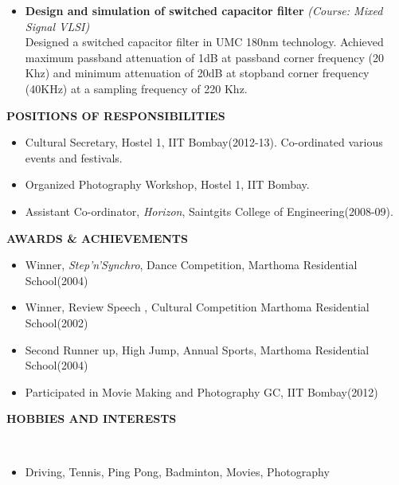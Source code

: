 \documentclass[a4paper,10pt]{article}
\begin{document}
\begin{itemize}
% 	
   \item \textbf{{Design and simulation of switched capacitor filter}} \textit{(Course: Mixed Signal VLSI)}\\
 	Designed a switched capacitor filter in UMC 180nm technology. Achieved maximum passband attenuation of 1dB at passband corner frequency (20 Khz)
 	and minimum attenuation of 20dB at stopband corner frequency (40KHz) at a sampling frequency of 220 Khz.  
 \end{itemize}
 

 \colorbox{titleColor}{\parbox{6.5in}{\textbf{POSITIONS OF RESPONSIBILITIES}}}
   \begin{itemize}
    \item Cultural Secretary, Hostel 1, IIT Bombay(2012-13). Co-ordinated various events and festivals.
    \item Organized Photography Workshop, Hostel 1, IIT Bombay. 
    \item Assistant Co-ordinator, \textit{Horizon}, Saintgits College of Engineering(2008-09).
  \end{itemize}
%  
 \colorbox{titleColor}{\parbox{6.5in}{\textbf{AWARDS \& ACHIEVEMENTS}}}
  \begin{itemize}
  \item Winner, \textit{Step'n'Synchro}, Dance Competition, Marthoma Residential School(2004)
  \item Winner, Review Speech , Cultural Competition Marthoma Residential School(2002)
  \item Second Runner up, High Jump, Annual Sports,  Marthoma Residential School(2004)
  \item Participated in Movie Making and Photography GC, IIT Bombay(2012) 
  \end{itemize} 

 \colorbox{titleColor}{\parbox{6.5in}{\textbf{HOBBIES AND INTERESTS}}}\\
  \begin{itemize}
   \item Driving, Tennis, Ping Pong, Badminton, Movies, Photography
  \end{itemize}
\end{document}
